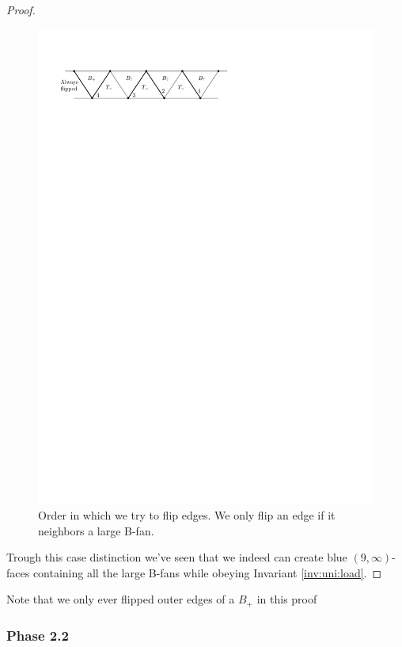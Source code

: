 \begin{proof}
      \begin{figure}[h]
        \centering
        \includegraphics[scale=1]{unifiedAlgo/img/placeEdges}
        \caption{Order in which we try to flip edges. We only flip an edge if it neighbors a large B-fan.}
        \label{fig:uni:placeedges}
      \end{figure}

      Trough this case distinction we've seen that we indeed can create blue $(9,\infty)$-faces containing all the large B-fans while obeying Invariant \ref{inv:uni:load}.

    \end{proof}

      Note that we only ever flipped outer edges of a $B_+$ in this proof


  \subsubsection{Phase 2.2}

